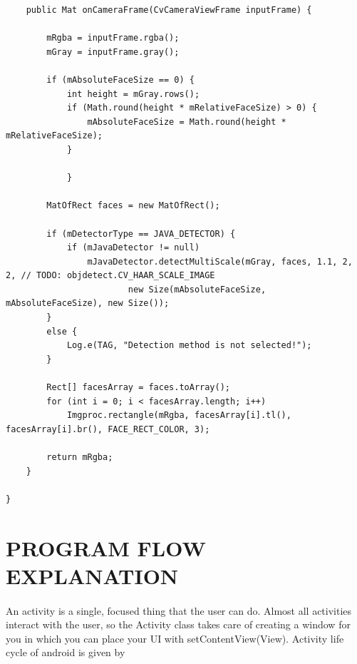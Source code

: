 \documentclass[11pt,a4paper,twoside]{report}
\begin{document}
\begin{appendix}
\begin{tiny}
\begin{flushleft}
\begin{lstlisting}
    public Mat onCameraFrame(CvCameraViewFrame inputFrame) {

        mRgba = inputFrame.rgba();
        mGray = inputFrame.gray();

        if (mAbsoluteFaceSize == 0) {
            int height = mGray.rows();
            if (Math.round(height * mRelativeFaceSize) > 0) {
                mAbsoluteFaceSize = Math.round(height * mRelativeFaceSize);
            }

	        }

        MatOfRect faces = new MatOfRect();

        if (mDetectorType == JAVA_DETECTOR) {
            if (mJavaDetector != null)
                mJavaDetector.detectMultiScale(mGray, faces, 1.1, 2, 2, // TODO: objdetect.CV_HAAR_SCALE_IMAGE
                        new Size(mAbsoluteFaceSize, mAbsoluteFaceSize), new Size());
        }
        else {
            Log.e(TAG, "Detection method is not selected!");
        }

        Rect[] facesArray = faces.toArray();
        for (int i = 0; i < facesArray.length; i++)
            Imgproc.rectangle(mRgba, facesArray[i].tl(), facesArray[i].br(), FACE_RECT_COLOR, 3);

        return mRgba;
    }

}

\end{lstlisting}


\end{flushleft}
\end{tiny}
\newpage
\section{PROGRAM FLOW EXPLANATION}
\paragraph{ }
An activity is a single, focused thing that the user can do. Almost all activities interact with the user, so the Activity class takes care of creating a window for you in which you can place your UI with setContentView(View). Activity life cycle of android is given by
\begin{figure}[htpb]


\end{figure}
\end{appendix}
\end{document}
